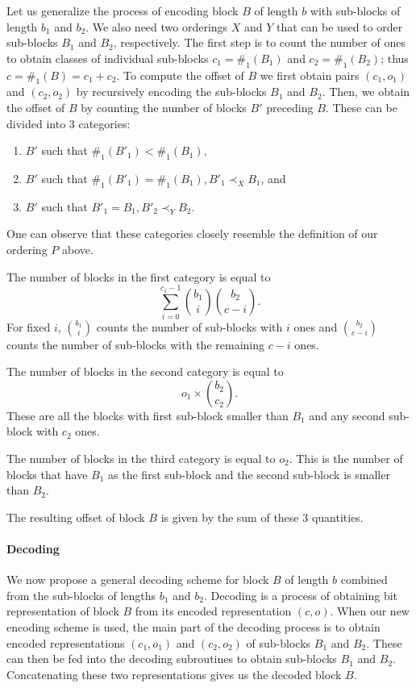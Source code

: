 Let us generalize the process of encoding block $B$ of length $b$
with sub-blocks of length $b_1$ and $b_2$. We also need two orderings $X$ and $Y$
that can be used to order sub-blocks $B_1$ and $B_2$, respectively.
The first step is to count the number of ones to obtain classes of individual
sub-blocks $c_1 = \#_1(B_1)$ and $c_2=\#_1(B_2)$; thus $c=\#_1(B) = c_1+c_2$.
To compute the offset of $B$ we first obtain pairs $(c_1, o_1)$ and $(c_2, o_2)$ by
recursively encoding the sub-blocks $B_1$ and $B_2$. Then, we obtain the offset of $B$
by counting the number of blocks $B'$ preceding $B$. These can be divided into 3 categories:
\begin{enumerate}
    \item $B'$ such that $\#_1(B'_1) < \#_1(B_1)$,
    \label{chapter3:encoding:1}
    \item $B'$ such that $\#_1(B'_1) = \#_1(B_1), B'_1\prec_X B_1$, and
    \label{chapter3:encoding:2}
    \item $B'$ such that $B'_1 = B_1, B'_2\prec_Y B_2$.
    \label{chapter3:encoding:3}
\end{enumerate}
One can observe that these categories closely resemble the definition of our ordering
$P$ above.

The number of blocks in the first category is equal to
$$\sum_{i=0}^{c_1-1} {b_1\choose i} {b_2\choose c-i}.$$ For fixed $i$, ${b_1\choose i}$
counts the number of sub-blocks with $i$ ones and ${b_2\choose c-i}$ counts the number
of sub-blocks with the remaining $c-i$ ones.

The number of blocks in the second category is equal to
$$o_1\times {b_2\choose c_2}.$$ These are all the blocks with first sub-block smaller
than $B_1$ and any second sub-block with $c_2$ ones.

The number of blocks in the third category is equal to $o_2$.
This is the number of blocks that have $B_1$ as the first sub-block and the second
sub-block is smaller than $B_2$.

The resulting offset of block $B$ is given by the sum of these 3 quantities.

\paragraph{Decoding}

We now propose a general decoding scheme for block $B$ of length $b$ combined from the
sub-blocks of lengths $b_1$ and $b_2$. Decoding is a process of obtaining bit representation
of block $B$ from its encoded representation $(c, o)$. When our new encoding scheme is used,
the main part of the decoding process is to obtain encoded representations $(c_1, o_1)$ and
$(c_2, o_2)$ of sub-blocks $B_1$ and $B_2$. These can then be fed into the decoding subroutines
to obtain sub-blocks $B_1$ and $B_2$. Concatenating these two representations gives us the
decoded block $B$.


